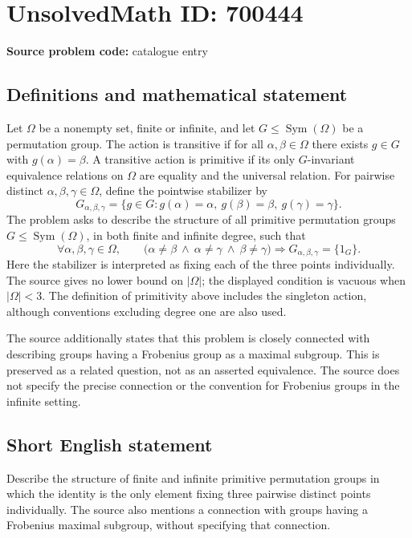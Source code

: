 \documentclass[11pt]{article}
\begin{document}
\section*{UnsolvedMath ID: 700444}
\textbf{Source problem code:} catalogue entry
\subsection{Definitions and mathematical statement}
Let \(\Omega\) be a nonempty set, finite or infinite, and let \(G\leq \operatorname{Sym}(\Omega)\) be a permutation group. The action is transitive if for all \(\alpha,\beta\in\Omega\) there exists \(g\in G\) with \(g(\alpha)=\beta\). A transitive action is primitive if its only \(G\)-invariant equivalence relations on \(\Omega\) are equality and the universal relation. For pairwise distinct \(\alpha,\beta,\gamma\in\Omega\), define the pointwise stabilizer by
\[
G_{\alpha,\beta,\gamma}=\{g\in G:g(\alpha)=\alpha,\ g(\beta)=\beta,\ g(\gamma)=\gamma\}.
\]
The problem asks to describe the structure of all primitive permutation groups \(G\leq\operatorname{Sym}(\Omega)\), in both finite and infinite degree, such that
\[
\forall\alpha,\beta,\gamma\in\Omega,\qquad
\bigl(\alpha\ne\beta\ \land\ \alpha\ne\gamma\ \land\ \beta\ne\gamma\bigr)
\Longrightarrow G_{\alpha,\beta,\gamma}=\{1_G\}.
\]
Here the stabilizer is interpreted as fixing each of the three points individually. The source gives no lower bound on \(|\Omega|\); the displayed condition is vacuous when \(|\Omega|<3\). The definition of primitivity above includes the singleton action, although conventions excluding degree one are also used.

The source additionally states that this problem is closely connected with describing groups having a Frobenius group as a maximal subgroup. This is preserved as a related question, not as an asserted equivalence. The source does not specify the precise connection or the convention for Frobenius groups in the infinite setting.
\subsection{Short English statement}
Describe the structure of finite and infinite primitive permutation groups in which the identity is the only element fixing three pairwise distinct points individually. The source also mentions a connection with groups having a Frobenius maximal subgroup, without specifying that connection.
\end{document}
